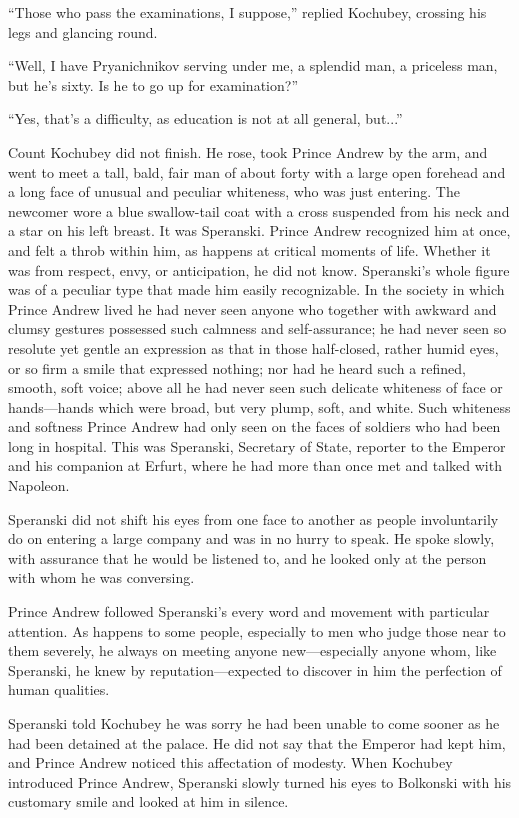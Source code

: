 ``Those who pass the examinations, I suppose,'' replied Kochubey,
crossing his legs and glancing round.

``Well, I have Pryanichnikov serving under me, a splendid man, a
priceless man, but he's sixty. Is he to go up for examination?''

``Yes, that's a difficulty, as education is not at all general,
but...''

Count Kochubey did not finish. He rose, took Prince Andrew by the
arm, and went to meet a tall, bald, fair man of about forty with
a large open forehead and a long face of unusual and peculiar
whiteness, who was just entering. The newcomer wore a blue
swallow-tail coat with a cross suspended from his neck and a star
on his left breast. It was Speranski.  Prince Andrew recognized
him at once, and felt a throb within him, as happens at critical
moments of life. Whether it was from respect, envy, or
anticipation, he did not know. Speranski's whole figure was of a
peculiar type that made him easily recognizable. In the society
in which Prince Andrew lived he had never seen anyone who
together with awkward and clumsy gestures possessed such calmness
and self-assurance; he had never seen so resolute yet gentle an
expression as that in those half-closed, rather humid eyes, or so
firm a smile that expressed nothing; nor had he heard such a
refined, smooth, soft voice; above all he had never seen such
delicate whiteness of face or hands---hands which were broad, but
very plump, soft, and white. Such whiteness and softness Prince
Andrew had only seen on the faces of soldiers who had been long
in hospital. This was Speranski, Secretary of State, reporter to
the Emperor and his companion at Erfurt, where he had more than
once met and talked with Napoleon.

Speranski did not shift his eyes from one face to another as
people involuntarily do on entering a large company and was in no
hurry to speak. He spoke slowly, with assurance that he would be
listened to, and he looked only at the person with whom he was
conversing.

Prince Andrew followed Speranski's every word and movement with
particular attention. As happens to some people, especially to
men who judge those near to them severely, he always on meeting
anyone new---especially anyone whom, like Speranski, he knew by
reputation---expected to discover in him the perfection of human
qualities.

Speranski told Kochubey he was sorry he had been unable to come
sooner as he had been detained at the palace. He did not say that
the Emperor had kept him, and Prince Andrew noticed this
affectation of modesty.  When Kochubey introduced Prince Andrew,
Speranski slowly turned his eyes to Bolkonski with his customary
smile and looked at him in silence.

